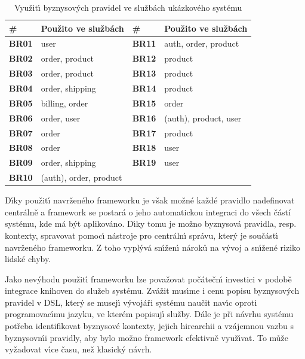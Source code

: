 \begin{table}
    \centering
    \begin{tabularx}{\textwidth}{ l X | l X }
        \hline
        \textbf{\#} & \textbf{Použito ve službách} & \textbf{\#} & \textbf{Použito ve službách} \\ \hline \hline
        \textbf{BR01} & user & \textbf{BR11} & auth, order, product \\
        \textbf{BR02} & order, product & \textbf{BR12} & product \\
        \textbf{BR03} & order, product & \textbf{BR13} & product \\
        \textbf{BR04} & order, shipping & \textbf{BR14} & product \\
        \textbf{BR05} & billing, order & \textbf{BR15} & order \\
        \textbf{BR06} & order, user & \textbf{BR16} & (auth), product, user \\
        \textbf{BR07} & order & \textbf{BR17} & product \\
        \textbf{BR08} & order & \textbf{BR18} & user \\
        \textbf{BR09} & order, shipping & \textbf{BR19} & user \\
        \textbf{BR10} & (auth), order, product & \\
        \hline
    \end{tabularx}
    \caption{Využit\'{\i} byznysov\'ych pravidel ve službách ukázkového systému}
    \label{tbl:duplication}
\end{table}

D\'{\i}ky použit\'{\i} navrženého frameworku je však možné každé pravidlo nadefinovat centrálně
a framework se postará o jeho automatickou integraci do všech částí systému, kde má být aplikováno.
D\'{\i}ky tomu je možno byznysová pravidla, resp. kontexty, spravovat pomoc\'{\i} nástroje pro
centráln\'{\i} správu, kter\'y je součást\'{\i} navrženého frameworku. Z toho vypl\'yvá
sn\'{\i}žen\'{\i} nároků na v\'yvoj a sn\'{\i}žené riziko lidské chyby.

Jako nev\'yhodu použit\'{\i} frameworku lze považovat počátečn\'{\i} investici v
podobě integrace knihoven do služeb systému. Zvážit mus\'{\i}me i cenu popisu byznysov\'ych pravidel
v \gls{DSL}, kter\'y se musej\'{\i} v\'yvojáři systému naučit nav\'{\i}c oproti programovac\'{\i}mu jazyku,
ve kterém popisuj\'{\i} služby. Dále je při návrhu systému potřeba identifikovat byznysové kontexty, jejich
hirearchii a vzájemnou vazbu s byznysov\'mi pravidly, aby bylo možno framework efektivně využ\'{\i}vat.
To může vyžadovat v\'{\i}ce času, než klasick\'y návrh.

